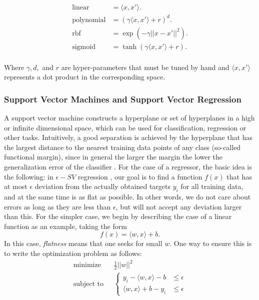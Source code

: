 \begin{align}
\text{linear} &= \langle x, x' \rangle. \\
\text{polynomial} &= (\gamma \langle x, x' \rangle + r )^d .\\
\text{rbf} &= \exp(-\gamma  ||x - x'||^2 ) .\\
\text{sigmoid} &= \tanh(\gamma \langle x, x' \rangle + r ) .\\
\end{align}

Where $\gamma, d,$ and $r$ are hyper-parameters that must be tuned by hand and $\langle x, x' \rangle$ represents a dot product in the corresponding space. 
\subsubsection{Support Vector Machines and Support Vector Regression}
A support vector machine constructs a hyperplane or set of hyperplanes in a high or infinite dimensional space, which can be used for classification, regression or other tasks. Intuitively, a good separation is achieved by the hyperplane that has the largest distance to the nearest training data points of any class (so-called functional margin), since in general the larger the margin the lower the generalization error of the classifier \cite{SMOLA2004}. For the case of a regressor, the basic idea is the following: in $\epsilon-SV$ regression \cite{Vapnik2000}, our goal is to find a function $f(x)$ that has at most $\epsilon$ deviation from the actually obtained targets $y_i$ for all training data, and at the same time is as flat as possible. In other words, we do not care about errors as long as they are less than $\epsilon$, but will not accept any deviation larger than this. For the simpler case, we begin by describing the case of a linear function as an example, taking the form
\begin{equation}
f(x) = \langle w, x \rangle + b.
\end{equation}
In this case, \textit{flatness} means that one seeks for small $w$. One way to ensure this is to write the optimization problem as follows:
\begin{align}
\text{minimize} \,\,\, \, &\frac{1}{2}||w||^2 \\
\text{subject to} \,\,\,\, &
\begin{cases}
y_i - \langle w, x \rangle  - b & \leq \epsilon \\
\langle w, x \rangle  + b - y_i &\leq \epsilon
\end{cases}
\end{align}
